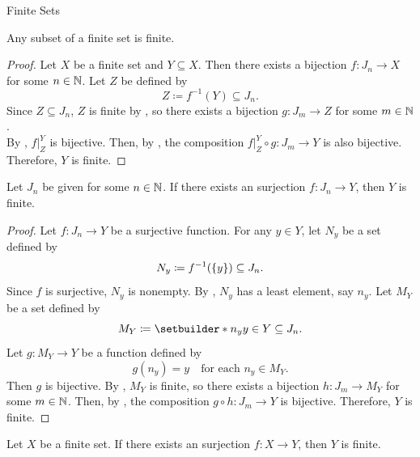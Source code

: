 \begin{section}{Finite Sets}
\bigskip

\begin{theorem} \label{thm:SubsetOfFiniteSetIsFinite}
    Any subset of a finite set is finite.
\end{theorem}

\begin{proof}
    Let $X$ be a finite set and $Y \subseteq X$. Then there exists a bijection
    $f: J_{n} \to X$ for some $n \in \N$. Let $Z$ be defined by
    \[
    Z \coloneqq f^{-1}(Y) \subseteq J_{n}.
    \]
    Since $Z \subseteq J_{n}$, $Z$ is finite by
    , so there exists a bijection $g: J_{m} \to Z$ for some $m \in \N$.
    \\[6mm]
    By , $f|_{Z}^{Y}$ is bijective. Then, by
    , the composition $f|_{Z}^{Y} \circ g: J_{m} \to Y$
    is also bijective. Therefore, $Y$ is finite.
\end{proof}

\bigskip

\begin{lemma} \label{lem:SurjectionFromJnImpliesFinite}
    Let $J_{n}$ be given for some $n \in \N$. If there exists an surjection $f: J_{n} \to Y$, then $Y$ is finite.
\end{lemma}

\begin{proof}
    Let $f: J_{n} \to Y$ be a surjective function. For any $y \in Y$, let $N_{y}$ be a set defined by
    \[
    N_{y} \coloneqq f^{-1}(\set*{y}) \subseteq J_{n}.
    \]
    Since $f$ is surjective, $N_{y}$ is nonempty. By , $N_{y}$ has a least element, say
    $n_{y}$. Let $M_{Y}$ be a set defined by
    \[
    M_{Y} \coloneqq \setbuilder*{n_{y}}{y \in Y} \subseteq J_{n}.
    \]
    Let $g: M_{Y} \to Y$ be a function defined by
    \[
    g(n_{y}) = y \quad \text{for each } n_{y} \in M_{Y}.
    \]
    Then $g$ is bijective. By , $M_{Y}$ is finite, so there exists
    a bijection $h: J_{m} \to M_{Y}$ for some $m \in \N$. Then, by ,
    the composition $g \circ h: J_{m} \to Y$ is bijective. Therefore, $Y$ is finite.
\end{proof}

\bigskip

\begin{theorem} \label{thm:SurjectionFromFiniteSetImpliesFinite}
    Let $X$ be a finite set. If there exists an surjection $f: X \to Y$, then $Y$ is finite.
\end{theorem}


\end{section}
